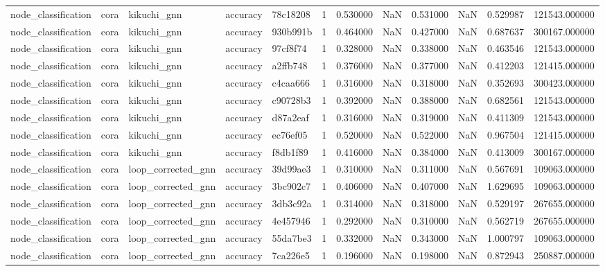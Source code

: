 \begin{tabular}{lllllrrrrrrr}
node_classification & cora & kikuchi_gnn & accuracy & 78c18208 & 1 & 0.530000 & NaN & 0.531000 & NaN & 0.529987 & 121543.000000 \\
node_classification & cora & kikuchi_gnn & accuracy & 930b991b & 1 & 0.464000 & NaN & 0.427000 & NaN & 0.687637 & 300167.000000 \\
node_classification & cora & kikuchi_gnn & accuracy & 97cf8f74 & 1 & 0.328000 & NaN & 0.338000 & NaN & 0.463546 & 121543.000000 \\
node_classification & cora & kikuchi_gnn & accuracy & a2ffb748 & 1 & 0.376000 & NaN & 0.377000 & NaN & 0.412203 & 121415.000000 \\
node_classification & cora & kikuchi_gnn & accuracy & c4caa666 & 1 & 0.316000 & NaN & 0.318000 & NaN & 0.352693 & 300423.000000 \\
node_classification & cora & kikuchi_gnn & accuracy & c90728b3 & 1 & 0.392000 & NaN & 0.388000 & NaN & 0.682561 & 121543.000000 \\
node_classification & cora & kikuchi_gnn & accuracy & d87a2eaf & 1 & 0.316000 & NaN & 0.319000 & NaN & 0.411309 & 121543.000000 \\
node_classification & cora & kikuchi_gnn & accuracy & ec76ef05 & 1 & 0.520000 & NaN & 0.522000 & NaN & 0.967504 & 121415.000000 \\
node_classification & cora & kikuchi_gnn & accuracy & f8db1f89 & 1 & 0.416000 & NaN & 0.384000 & NaN & 0.413009 & 300167.000000 \\
node_classification & cora & loop_corrected_gnn & accuracy & 39d99ae3 & 1 & 0.310000 & NaN & 0.311000 & NaN & 0.567691 & 109063.000000 \\
node_classification & cora & loop_corrected_gnn & accuracy & 3bc902c7 & 1 & 0.406000 & NaN & 0.407000 & NaN & 1.629695 & 109063.000000 \\
node_classification & cora & loop_corrected_gnn & accuracy & 3db3c92a & 1 & 0.314000 & NaN & 0.318000 & NaN & 0.529197 & 267655.000000 \\
node_classification & cora & loop_corrected_gnn & accuracy & 4e457946 & 1 & 0.292000 & NaN & 0.310000 & NaN & 0.562719 & 267655.000000 \\
node_classification & cora & loop_corrected_gnn & accuracy & 55da7be3 & 1 & 0.332000 & NaN & 0.343000 & NaN & 1.000797 & 109063.000000 \\
node_classification & cora & loop_corrected_gnn & accuracy & 7ca226e5 & 1 & 0.196000 & NaN & 0.198000 & NaN & 0.872943 & 250887.000000 \\

\end{tabular}
